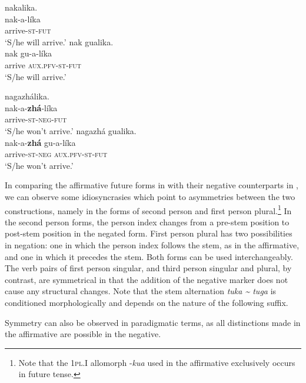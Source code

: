 \documentclass[output=paper,colorlinks,citecolor=brown]{langscibook}
\begin{document}
\ea\label{ex:kog:8}
    \ea\label{ex:kog:8a} nakalika.\\
        \gll  nak{}-a{}-líka\\ 
              arrive{}-\textsc{st{}-fut}\\
        \glt ‘S/he will arrive.’
    \ex\label{ex:kog:8b} nak gualika.\\
        \gll  nak gu-a-líka\\
              arrive \textsc{aux.pfv-st{}-fut}\\
        \glt ‘S/he will arrive.’
    \z
\z 

\ea\label{ex:kog:9}
    \ea\label{ex:kog:9a}nagazhálika.\\
        \gll  nak-a{}-\textbf{{zhá}}-líka \\
               arrive\textsc{{}-st{}-neg-fut}\\
        \glt ‘S/he won't arrive.’ 
    \ex\label{ex:kog:9b}nagazhá gualika.\\
        \gll  nak-a{}-\textbf{zhá} gu-a{}-líka\\
               arrive\textsc{-st{}-neg} \textsc{aux.pfv-st-fut}\\
        \glt ‘S/he won't arrive.’ 
    \z
\z 

In comparing the affirmative future forms in  with their negative counterparts in , we can observe some idiosyncrasies which point to asymmetries between the two constructions, namely in the forms of second person and first person plural.\footnote{Note that the 1\textsc{pl.I} allomorph -\textit{kua} used in the affirmative exclusively occurs in future tense.} In the second person forms, the person index changes from a pre-stem position to post-stem position in the negated form. First person plural has two possibilities in negation: one in which the person index follows the stem, as in the affirmative, and one in which it precedes the stem. Both forms can be used interchangeably. The verb pairs of first person singular, and third person singular and plural, by contrast, are symmetrical in that the addition of the negative marker does not cause any structural changes. Note that the stem alternation \textit{tuka {\textasciitilde} tuga} is conditioned morphologically and depends on the nature of the following suffix. 

Symmetry can also be observed in paradigmatic terms, as all distinctions made in the affirmative are possible in the negative.
\end{document}

